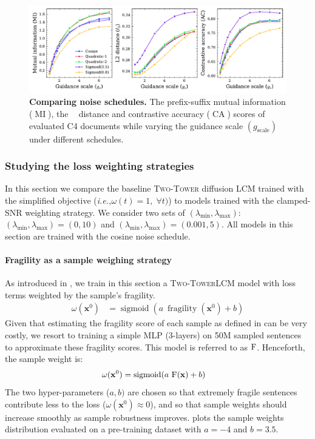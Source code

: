 \documentclass[twoside,11pt]{fairmeta}
\newcommand{\lcm}{\textsc{LCM}\xspace}
\newcommand{\twotower}{\textsc{Two-Tower}\xspace}
\newcommand{\diffx}[2]{\rvx^{#1}_{#2}}
\DeclareMathOperator{\fragility}{fragility}
\DeclareMathOperator{\sigmoid}{sigmoid}
\newcommand{\guidance}{g_\text{scale}}
\DeclareMathOperator{\ltwo}{\ell_2}
\DeclareMathOperator{\mseacc}{CA}
\DeclareMathOperator{\mutinfo}{MI}
\newcommand{\cfour}{\textsc{C4}\xspace}
\newcommand{\ie}{\textit{i.e.,}\xspace}
\def\rF{{\textnormal{F}}}
\def\rvx{{\mathbf{x}}}
\begin{document}
\begin{figure}[!htb]
    \centering
    \includegraphics[width=.9\linewidth]{figures/lineplots/schedules_comp.pdf}
    \caption{\textbf{Comparing noise schedules.} The prefix-suffix mutual information ($\mutinfo$), the $\ltwo$ distance and contrastive accuracy ($\mseacc$) scores of evaluated \cfour documents while varying the guidance scale $(\guidance)$ under different schedules.}
    \label{fig:arch:schedules:sweep}
\end{figure}

\subsubsection{Studying the loss weighting strategies}
In this section we compare the baseline \twotower diffusion \lcm trained with the simplified objective (\ie $\omega(t)=1,\;\forall t)$) to models trained with the clamped-SNR weighting strategy. We consider two sets of $(\lambda_{\min}, \lambda_{\max})$: $(\lambda_{\min}, \lambda_{\max}) = (0, 10)$ and $(\lambda_{\min}, \lambda_{\max})=(0.001, 5)$. All models in this section are trained with the cosine noise schedule.


\paragraph{Fragility as a sample weighing strategy}
As introduced in , we train in this section a \twotower \lcm model with loss terms weighted by the sample's fragility.
\begin{align}
\omega(\diffx{0}{}) &= \sigmoid(a ~\fragility(\diffx{0}{}) + b)
\end{align}
Given that estimating the fragility score of each sample as defined in  can be very costly, we resort to training a simple MLP (3-layers) on 50M sampled sentences to approximate these fragility scores. This model is referred to as $\rF$. Henceforth, the sample weight is:
\begin{align}
\omega(\diffx{0}{}) &= \sigmoid(a ~\rF(\rvx) + b)
\end{align}
The two hyper-parameters ($a, b)$ are chosen so that extremely fragile sentences contribute less to the loss ($\omega(\diffx{0}{})\approx 0$),
and so that sample weights should increase smoothly as sample robustness improves.  plots the sample weights distribution evaluated on a pre-training 
dataset with $a=-4$ and $b=3.5$.
\end{document}
